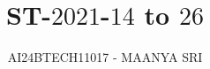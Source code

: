 \documentclass[journal]{IEEEtran}
\begin{document}

\vspace{3cm}

\title{ST-$2021$-$14$ to $26$}
\author{AI24BTECH11017 - MAANYA SRI
}
{\let\newpage\relax\maketitle}

\renewcommand{\thefigure}{\theenumi}
\renewcommand{\thetable}{\theenumi}
\setlength{\intextsep}{10pt} %


\renewcommand{\thetable}{\theenumi}
\end{document}
